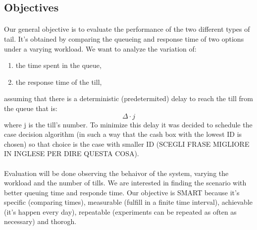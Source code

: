 \subsection{Objectives}
\paragraph{}
Our general objective is to evaluate the performance of the two different types of tail. It’s obtained by comparing the queueing and response time of two options under a varying workload. We want to analyze the variation of:
\begin{enumerate}
	\item the time spent in the queue, 
	\item the response time of the till,
\end{enumerate}
assuming that there is a deterministic (predetermited) delay to reach the till from the queue that is: \[\Delta \cdot j\] 
where j is the till’s number. To minimize this delay it was decided to schedule the case decision algorithm (in such a way that the cash box with the lowest ID is chosen) so that choice is the case with smaller ID (SCEGLI FRASE MIGLIORE IN INGLESE PER DIRE QUESTA COSA). 
\paragraph{} Evaluation will be done observing the behaivor of the system, varying the workload and the number of tills. We are interested in finding the scenario with better queuing time and responde time. 
Our objective is SMART because it’s specific (comparing times), measurable (fulfill in a finite time interval), achievable (it’s happen every day), repeatable (experiments can be repeated as often as necessary) and thorogh. 





